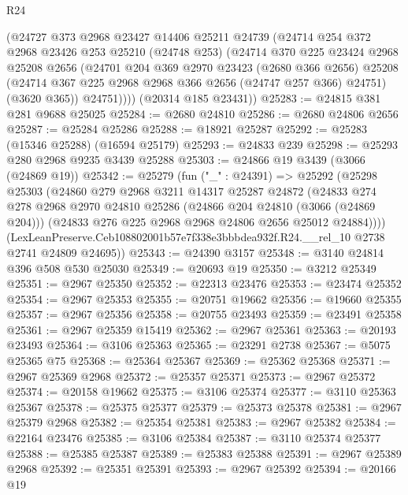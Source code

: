 \begin{lexlean}{R24}
\begin{coremodule}
        (@24727
          @373
          @2968
          @23427
          @14406
          @25211
          @24739
          (@24714
            @254
            @372
            @2968
            @23426
            @253
            @25210
            (@24748 @253)
            (@24714
              @370
              @225
              @23424
              @2968
              @25208
              @2656
              (@24701
                @204
                @369
                @2970
                @23423
                (@2680 @366 @2656)
                @25208
                (@24714 @367 @225 @2968 @2968 @366 @2656 (@24747 @257 @366) @24751)
                (@3620 @365))
              @24751))))
      (@20314 @185 @23431))
@25283 := @24815 @381 @281 @9688 @25025
@25284 := @2680 @24810
@25286 := @2680 @24806 @2656
@25287 := @25284 @25286
@25288 := @18921 @25287
@25292 := @25283 (@15346 @25288) (@16594 @25179)
@25293 := @24833 @239
@25298 := @25293 @280 @2968 @9235 @3439 @25288
@25303 := @24866 @19 @3439 (@3066 (@24869 @19))
@25342 := @25279
    (fun ("_" : @24391) =>
    @25292
      (@25298
        @25303
        (@24860
          @279
          @2968
          @3211
          @14317
          @25287
          @24872
          (@24833
            @274
            @278
            @2968
            @2970
            @24810
            @25286
            (@24866 @204 @24810 (@3066 (@24869 @204)))
            (@24833 @276 @225 @2968 @2968 @24806 @2656 @25012 @24884))))
      (LexLeanPreserve.Ceb108802001b57e7f338e3bbbdea932f.R24.__rel_10 @2738 @2741 @24809 @24695))
@25343 := @24390 @3157
@25348 := @3140 @24814 @396 @508 @530 @25030
@25349 := @20693 @19
@25350 := @3212 @25349
@25351 := @2967 @25350
@25352 := @22313 @23476
@25353 := @23474 @25352
@25354 := @2967 @25353
@25355 := @20751 @19662
@25356 := @19660 @25355
@25357 := @2967 @25356
@25358 := @20755 @23493
@25359 := @23491 @25358
@25361 := @2967 @25359 @15419
@25362 := @2967 @25361
@25363 := @20193 @23493
@25364 := @3106 @25363
@25365 := @23291 @2738
@25367 := @5075 @25365 @75
@25368 := @25364 @25367
@25369 := @25362 @25368
@25371 := @2967 @25369 @2968
@25372 := @25357 @25371
@25373 := @2967 @25372
@25374 := @20158 @19662
@25375 := @3106 @25374
@25377 := @3110 @25363 @25367
@25378 := @25375 @25377
@25379 := @25373 @25378
@25381 := @2967 @25379 @2968
@25382 := @25354 @25381
@25383 := @2967 @25382
@25384 := @22164 @23476
@25385 := @3106 @25384
@25387 := @3110 @25374 @25377
@25388 := @25385 @25387
@25389 := @25383 @25388
@25391 := @2967 @25389 @2968
@25392 := @25351 @25391
@25393 := @2967 @25392
@25394 := @20166 @19

\end{coremodule}
\end{lexlean}
